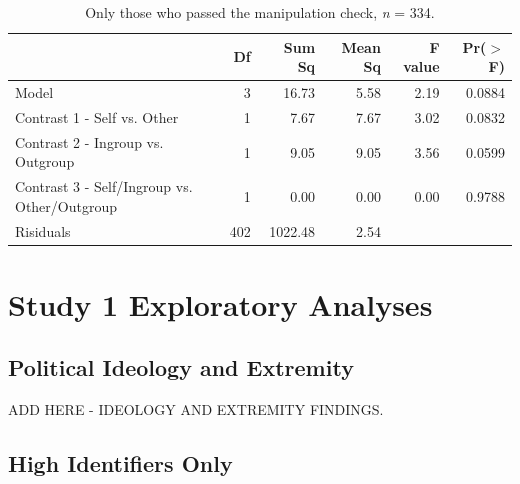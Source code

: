 \documentclass[12pt,]{article}
\begin{document}
\vspace{0.6cm}

\begin{table}[ht]
\centering
\begin{tabular}{lrrrrr}
  \hline
 & Df & Sum Sq & Mean Sq & F value & Pr($>$F) \\ 
  \hline
Model & 3 & 16.73 & 5.58 & 2.19 & 0.0884 \\ 
  Contrast 1 - Self vs. Other & 1 & 7.67 & 7.67 & 3.02 & 0.0832 \\ 
  Contrast 2 - Ingroup vs. Outgroup & 1 & 9.05 & 9.05 & 3.56 & 0.0599 \\ 
  Contrast 3 - Self/Ingroup vs. Other/Outgroup & 1 & 0.00 & 0.00 & 0.00 & 0.9788 \\ 
  Risiduals & 402 & 1022.48 & 2.54 &  &  \\ 
   \hline
\end{tabular}
\caption{Only those who passed the manipulation check, \emph{n} = 334.} 
\label{manip}
\end{table}



\newpage
\section{Study 1 Exploratory Analyses}
\label{appendix:study1_robust}


\subsection{Political Ideology and Extremity}
\label{appendix:ideo_extrem2}

ADD HERE - IDEOLOGY AND EXTREMITY FINDINGS. 



\clearpage
\subsection{High Identifiers Only}
\label{appendix:high_id1}
\end{document}
